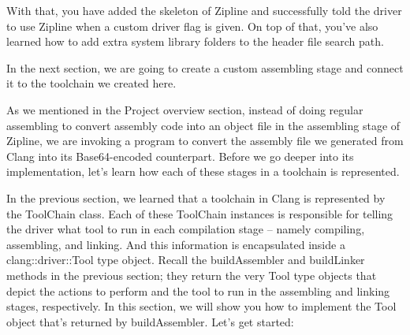 With that, you have added the skeleton of Zipline and successfully told the driver to use Zipline when a custom driver flag is given. On top of that, you've also learned how to add extra system library folders to the header file search path.

In the next section, we are going to create a custom assembling stage and connect it to the toolchain we created here.


As we mentioned in the Project overview section, instead of doing regular assembling to convert assembly code into an object file in the assembling stage of Zipline, we are invoking a program to convert the assembly file we generated from Clang into its Base64-encoded counterpart. Before we go deeper into its implementation, let's learn how each of these stages in a toolchain is represented.

In the previous section, we learned that a toolchain in Clang is represented by the ToolChain class. Each of these ToolChain instances is responsible for telling the driver what tool to run in each compilation stage – namely compiling, assembling, and linking. And this information is encapsulated inside a clang::driver::Tool type object. Recall the buildAssembler and buildLinker methods in the previous section; they return the very Tool type objects that depict the actions to perform and the tool to run in the assembling and linking stages, respectively. In this section, we will show you how to implement the Tool object that's returned by buildAssembler. Let's get started:

